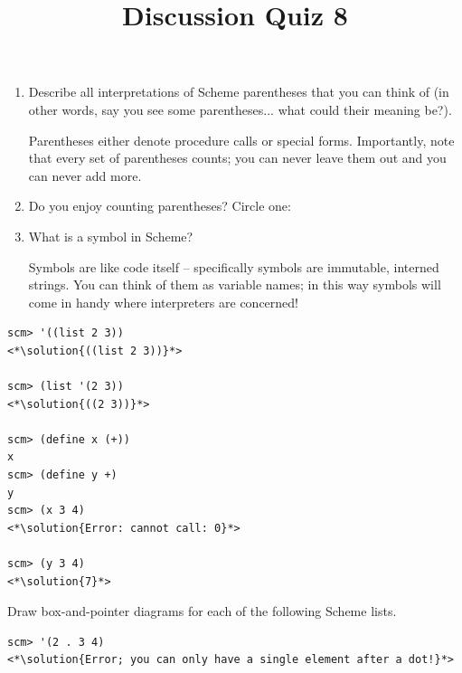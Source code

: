 \documentclass[twoside]{article}
\title{\sc Discussion Quiz 8 \solution{Solutions}}
\newcommand{\solution}[1]{{\color{red}#1}}
\newcommand\solution[1]{} %
\begin{document}
\thispagestyle{empty}
\maketitle

\begin{enumerate}

\begin{enumerate}
\item Describe all interpretations of Scheme parentheses that you can think of (in other words, say you see some parentheses... what could their meaning be?).

\solution{Parentheses either denote procedure calls or special forms. Importantly, note that every set of parentheses counts; you can never leave them out and you can never add more.}

\item Do you enjoy counting parentheses? Circle one:\:\:\solution{Yes}

\vspace{0.02in}

\vspace{0.02in}

\item What is a symbol in Scheme?

\solution{Symbols are like code itself -- specifically symbols are immutable, interned strings. You can think of them as variable names; in this way symbols will come in handy where interpreters are concerned!}

\end{enumerate}


\begin{lstlisting}
scm> '((list 2 3))
<*\solution{((list 2 3))}*>

scm> (list '(2 3))
<*\solution{((2 3))}*>

scm> (define x (+))
x
scm> (define y +)
y
scm> (x 3 4)
<*\solution{Error: cannot call: 0}*>

scm> (y 3 4)
<*\solution{7}*>
\end{lstlisting}


Draw box-and-pointer diagrams for each of the following Scheme lists.

\begin{lstlisting}
scm> '(2 . 3 4)
<*\solution{Error; you can only have a single element after a dot!}*>


\end{lstlisting}
\end{enumerate}
\end{document}
